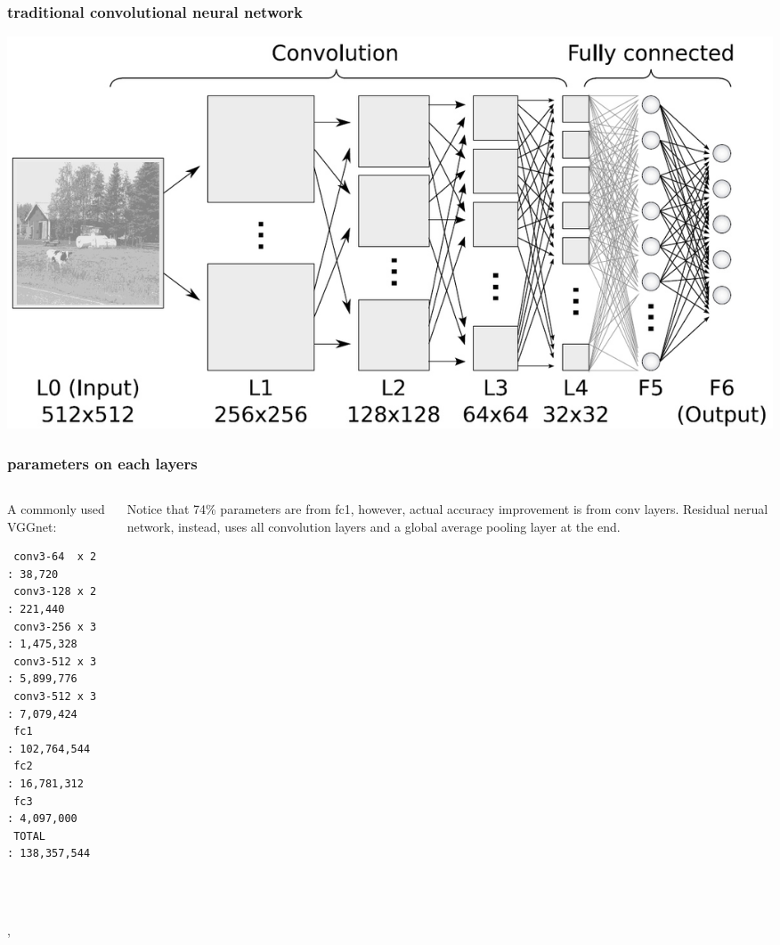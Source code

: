 \documentclass{beamer}
\begin{document}
\begin{frame}
\frametitle{traditional convolutional neural network}
\includegraphics[width=\textwidth]{Alex.jpg}
\end{frame}


\begin{frame}[fragile]
\frametitle{parameters on each layers}
\begin{columns}
\begin{column}{.5\textwidth}
 A commonly used VGGnet:
\begin{verbatim}
 conv3-64  x 2 : 38,720
 conv3-128 x 2 : 221,440
 conv3-256 x 3 : 1,475,328
 conv3-512 x 3 : 5,899,776
 conv3-512 x 3 : 7,079,424
 fc1           : 102,764,544
 fc2           : 16,781,312
 fc3           : 4,097,000
 TOTAL         : 138,357,544
\end{verbatim}
\end{column}
\begin{column}{.5\textwidth}
Notice that 74\% parameters are from fc1, however, actual accuracy improvement is from conv layers. Residual nerual network, instead, uses all convolution layers
 and a global average pooling layer at the end.
\end{column}
\end{columns}
{\color{white}{ a}}\\
{\color{white}{ a}}\\
\cite{springenberg2014striving},
\end{frame}
\end{document}

